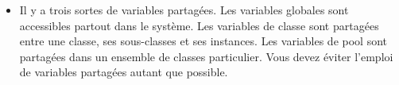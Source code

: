 \documentclass[a4paper,10pt,twoside]{book}
\begin{document}
\begin{itemize}
  \item Il y a trois sortes de variables partag\'ees.
Les variables globales sont accessibles partout dans le syst\`eme.
Les variables de classe sont partag\'ees entre une classe, ses sous-classes et
ses instances.
Les variables de pool sont partag\'ees dans un ensemble de classes particulier.
Vous devez \'eviter l'emploi de variables partag\'ees autant que possible.

\end{itemize}

\ifx\wholebook\relax\else
   
   
\end{document}
